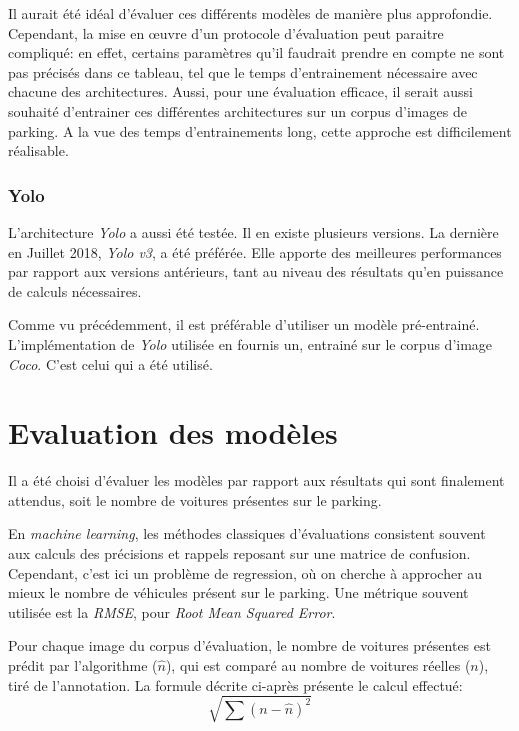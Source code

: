 Il aurait été idéal d'évaluer ces différents modèles de manière plus approfondie. Cependant, la mise en œuvre d'un protocole d'évaluation peut paraitre compliqué: en effet, certains paramètres qu'il faudrait prendre en compte ne sont pas précisés dans ce tableau, tel que le temps d'entrainement nécessaire avec chacune des architectures. Aussi, pour une évaluation efficace, il serait aussi souhaité d'entrainer ces différentes architectures sur un corpus d'images de parking. A la vue des temps d'entrainements long, cette approche est difficilement réalisable. 

\subsubsection{Yolo}

L'architecture \textit{Yolo} a aussi été testée. Il en existe plusieurs versions. La dernière en Juillet 2018, \textit{Yolo v3}, a été préférée. Elle apporte des meilleures performances par rapport aux versions antérieurs, tant au niveau des résultats qu'en puissance de calculs nécessaires\autocite{yolov3}.

Comme vu précédemment, il est préférable d'utiliser un modèle pré-entrainé. L'implémentation de \textit{Yolo} utilisée en fournis un, entrainé sur le corpus d'image \textit{Coco}\autocite{lib:yolo}. C'est celui qui a été utilisé. 

\section{Evaluation des modèles} \label{conception.eval}
Il a été choisi d'évaluer les modèles par rapport aux résultats qui sont finalement attendus, soit le nombre de voitures présentes sur le parking.

En \textit{machine learning}, les méthodes classiques d'évaluations consistent souvent aux calculs des précisions et rappels reposant sur une matrice de confusion. Cependant, c'est ici un problème de regression, où on cherche à approcher au mieux le nombre de véhicules présent sur le parking. Une métrique souvent utilisée est la \textit{RMSE}, pour \textit{Root Mean Squared Error}. \autocite{wiki:rmse}

Pour chaque image du corpus d'évaluation, le nombre de voitures présentes est prédit par l'algorithme ($\hat{n}$), qui est comparé au nombre de voitures réelles ($n$), tiré de l'annotation. La formule décrite ci-après présente le calcul effectué:
\[
    \sqrt{\sum (n - \hat{n})^2 }    
\]

